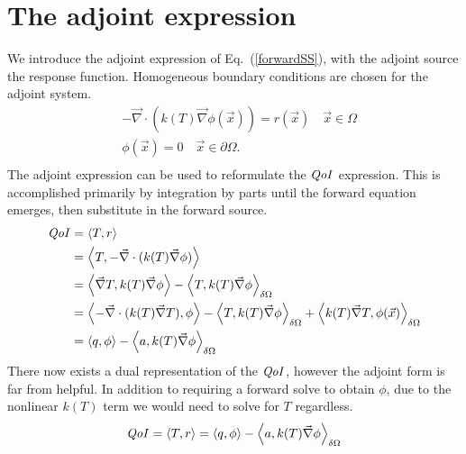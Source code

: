 \documentclass{article}
\newcommand{\vx}{\vec{x}}
\newcommand{\bra}{\left\langle}
\newcommand{\ket}{\right\rangle}
\newcommand{\ketbd}{\right\rangle_{\delta \Omega}}
\renewcommand{\div}{\vec{\nabla} \cdot}
\newcommand{\grad}{\vec{\nabla}}
\newcommand{\qoi}{{\it QoI}\xspace}
\begin{document}
\section{The adjoint expression}
We introduce the adjoint expression of Eq.~(\ref{forwardSS}), with the adjoint source the response function. Homogeneous boundary conditions are chosen for the adjoint system.
\begin{equation}
\label{adjointSS}
\begin{split}
& - \div ( k(T) \grad \phi (\vx) ) = r(\vx) \quad \vx \in \Omega \\
&\phi(\vx)=0 \quad \vx \in \partial \Omega .\\
\end{split}
\end{equation}
The adjoint expression can be used to reformulate the $\qoi$ expression. This is accomplished primarily by integration by parts until the forward equation emerges, then substitute in the forward source.
\begin{equation}
\label{qoidirv}
\begin{split}
\qoi &= \bra T , r \ket \\
&= \bra T , - \div ( k(T) \grad \phi ) \ket \\
&= \bra  \grad T ,  k(T) \grad \phi   \ket  - \bra T, k(T) \grad \phi  \ketbd\\
&= \bra - \div ( k(T) \grad T ), \phi   \ket  - \bra T, k(T) \grad \phi  \ketbd + \bra k(T) \grad T , \phi (\vx) \ketbd\\
&= \bra q , \phi   \ket  - \bra a, k(T) \grad \phi  \ketbd \\
\end{split}
\end{equation}
There now exists a dual representation of the $\qoi$, however the adjoint form is far from helpful. In addition to requiring a forward solve to obtain $\phi$, due to the nonlinear $k(T)$ term we would need to solve for $T$ regardless.
\begin{equation}
\qoi  = \bra T , r \ket = \bra q , \phi   \ket  - \bra a, k(T) \grad \phi  \ketbd
\end{equation}
\end{document}
